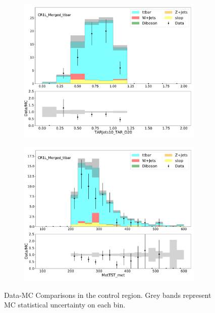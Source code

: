 \begin{figure}[htbp]
  \centering
     \begin{subfigure}{0.49\textwidth}
     \includegraphics[width = 0.98\textwidth]{Figures/4/datamc/CR1L_Merged_ttbar/TARJets10_TAR_D20.pdf}
     \caption{\DtwoTAR}
     \end{subfigure}
     \begin{subfigure}{0.49\textwidth}
     \includegraphics[width = 0.98\textwidth]{Figures/4/datamc/CR1L_Merged_ttbar/MetTST_met.pdf}
     \caption{\met}
     \end{subfigure}

     \caption{Data-MC Comparisons in the \merged \ttbar control region. Grey bands represent MC statistical uncertainty on each bin.}
     \label{fig:Data_MC_CRbV_merged}
  \end{figure}


